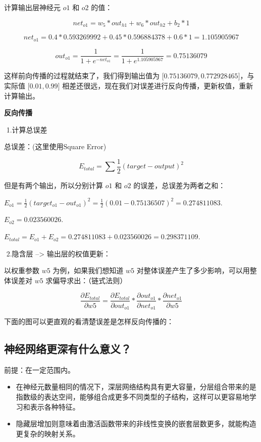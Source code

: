 计算输出层神经元 $ o1 $ 和 $ o2 $ 的值：

\[
net_{o1} = w_5 * out_{h1} + w_6 * out_{h2} + b_2 * 1
\]

\[
net_{o1} = 0.4 * 0.593269992 + 0.45 * 0.596884378 + 0.6 * 1 = 1.105905967
\]

\[
out_{o1} = \frac{1}{1 + e^{-net_{o1}}} = \frac{1}{1 + e^{1.105905967}} = 0.75136079
\]

这样前向传播的过程就结束了，我们得到输出值为 $ {[}0.75136079 ,
0.772928465{]} $，与实际值 $ {[}0.01 , 0.99{]} $
相差还很远，现在我们对误差进行反向传播，更新权值，重新计算输出。

\textbf{反向传播 }

​ 1.计算总误差

总误差：(这里使用Square Error)

\[
E_{total} = \sum \frac{1}{2}(target - output)^2
\]

但是有两个输出，所以分别计算 $ o1 $ 和 $ o2 $
的误差，总误差为两者之和：

\(E_{o1} = \frac{1}{2}(target_{o1} - out_{o1})^2 = \frac{1}{2}(0.01 - 0.75136507)^2 = 0.274811083\).

\(E_{o2} = 0.023560026\).

\(E_{total} = E_{o1} + E_{o2} = 0.274811083 + 0.023560026 = 0.298371109\).

​ 2.隐含层 --\textgreater{} 输出层的权值更新：

以权重参数 $ w5 $ 为例，如果我们想知道 $ w5 $
对整体误差产生了多少影响，可以用整体误差对 $ w5 $
求偏导求出：（链式法则）

\[
\frac{\partial E_{total}}{\partial w5} = \frac{\partial E_{total}}{\partial out_{o1}} * \frac{\partial out_{o1}}{\partial net_{o1}} * \frac{\partial net_{o1}}{\partial w5}
\]

下面的图可以更直观的看清楚误差是怎样反向传播的：

 

\subsection{ 神经网络更深有什么意义？}
\label{ux795eux7ecfux7f51ux7edcux66f4ux6df1ux6709ux4ec0ux4e48ux610fux4e49}
前提：在一定范围内。

\begin{itemize}
\item
  在神经元数量相同的情况下，深层网络结构具有更大容量，分层组合带来的是指数级的表达空间，能够组合成更多不同类型的子结构，这样可以更容易地学习和表示各种特征。
\item
  隐藏层增加则意味着由激活函数带来的非线性变换的嵌套层数更多，就能构造更复杂的映射关系。
\end{itemize}

